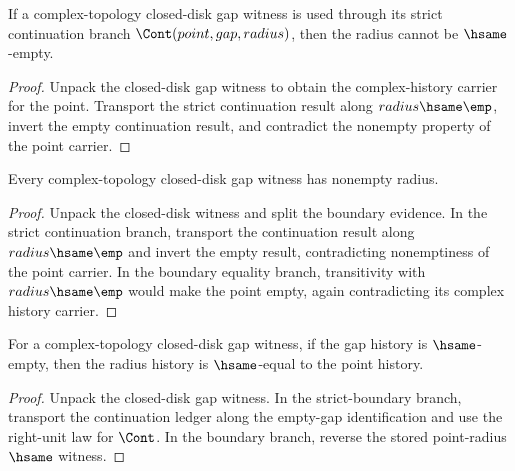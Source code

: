 \begin{lemma}
\label{lem:cplx-topo-closed-disk-gap-strict-radius-not-empty}
If a complex-topology closed-disk gap witness is used through its strict
continuation branch $\Cont(point,gap,radius)$, then the radius cannot be
$\hsame$-empty.
\end{lemma}
\begin{proof}
Unpack the closed-disk gap witness to obtain the complex-history carrier for
the point. Transport the strict continuation result along
$radius\hsame\emp$, invert the empty continuation result, and contradict the
nonempty property of the point carrier.
\end{proof}

\begin{theorem}
\label{thm:complex-topology-closed-disk-gap-radius-not-empty}
Every complex-topology closed-disk gap witness has nonempty radius.
\end{theorem}
\begin{proof}
Unpack the closed-disk witness and split the boundary evidence. In the strict
continuation branch, transport the continuation result along
$radius\hsame\emp$ and invert the empty result, contradicting nonemptiness of
the point carrier. In the boundary equality branch, transitivity with
$radius\hsame\emp$ would make the point empty, again contradicting its complex
history carrier.
\end{proof}

\begin{theorem}
\label{thm:complex-topology-closed-disk-gap-empty-gap-radius-point}
For a complex-topology closed-disk gap witness, if the gap history is
\(\hsame\)-empty, then the radius history is \(\hsame\)-equal to the point
history.
\end{theorem}
\begin{proof}
Unpack the closed-disk gap witness. In the strict-boundary branch, transport
the continuation ledger along the empty-gap identification and use the
right-unit law for \(\Cont\). In the boundary branch, reverse the stored
point-radius \(\hsame\) witness.
\end{proof}

